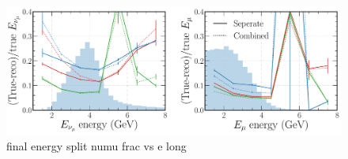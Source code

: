 \begin{figure} %
    \includegraphics[width=\textwidth]{diagrams/6-cvn/chipsnet/final_energy_split_numu_frac_vs_e.pdf}
    \caption[final energy split numu frac vs e short]
    {final energy split numu frac vs e long}
    \label{fig:final_energy_split_numu_frac_vs_e}
\end{figure}